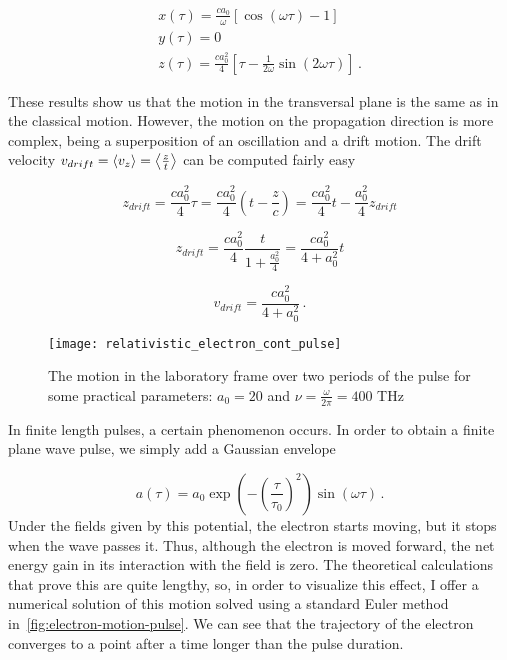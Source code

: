 \documentclass[12pt, class=report, crop=false]{standalone}
\begin{document}
\begin{subequations}
  \begin{align}
    x(\tau) = \frac{ca_0}{\omega} \left[\cos(\omega \tau) - 1 \right] \\
    y(\tau) = 0\\
    z(\tau) = \frac{ca_0^2}{4} \left[\tau - \frac{1}{2\omega} \sin(2\omega \tau)\right]\,.
  \end{align}
\end{subequations}

These results show us that the motion in the transversal plane is the same as in the classical motion. However, the motion on the propagation direction is more complex, being a superposition of an oscillation and a drift motion. The drift velocity \(v_{drift} = \expval{v_z} = \expval{\frac{z}{t}}\) can be computed fairly easy

\begin{equation*}
  z_{drift} = \frac{ca_0^2}{4} \tau = \frac{ca_0^2}{4} \left( t - \frac{z}{c} \right) = \frac{ca_0^2}{4} t - \frac{a_0^2}{4} z_{drift}
\end{equation*}

\begin{equation*}
  z_{drift} = \frac{ca_0^2}{4} \frac{t}{1+\frac{a_0^2}{4}} = \frac{ca_0^2}{4+a_0^2} t
\end{equation*}

\begin{equation}
  v_{drift} = \frac{ca_0^2}{4+a_0^2}\,.
\end{equation}

\begin{figure}[h]
  \centering
  \texttt{[image: relativistic\_electron\_cont\_pulse]}%
  \caption{The motion in the laboratory frame over two periods of the pulse for some practical parameters: \(a_0 = 20\) and \(\nu=\frac{\omega}{2\pi} = 400\) THz}\label{fig:electron-motion-cont}%
\end{figure}

In finite length pulses, a certain phenomenon occurs. In order to obtain a finite plane wave pulse, we simply add a Gaussian envelope

\begin{equation}
  a(\tau) = a_0 \exp(-\left(\frac{\tau}{\tau_0}\right)^2) \sin(\omega \tau)\,.
\end{equation}
Under the fields given by this potential, the electron starts moving, but it stops when the wave passes it. Thus, although the electron is moved forward, the net energy gain in its interaction with the field is zero. The theoretical calculations that prove this are quite lengthy, so, in order to visualize this effect, I offer a numerical solution of this motion solved using a standard Euler method in~\cref{fig:electron-motion-pulse}. We can see that the trajectory of the electron converges to a point after a time longer than the pulse duration.
\end{document}

